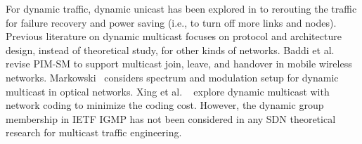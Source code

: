\documentclass[10pt, conference, letterpaper]{IEEEtran}
\theoremstyle{definition}
\begin{document}
For dynamic traffic, dynamic unicast has been explored in \cite{DynamicRouting-SDN,CompetitiveRouting,failure_recovery_rerouting,power_saving_rerouting} to rerouting the traffic for failure recovery and power saving (i.e., to turn off more links and nodes). Previous literature on dynamic multicast focuses on protocol and architecture design, instead of theoretical study, for other kinds of networks. Baddi et al.\cite{dynamic_multicast_mobile_ip} revise PIM-SM to support multicast join, leave, and handover in mobile wireless networks. Markowski~\cite{dynamic_multicast_optical_networks} considers spectrum and modulation setup for dynamic multicast in optical networks. Xing et al. ~\cite{dynamic_multicast_network_coding} explore dynamic multicast with network coding to minimize the coding cost. However, the dynamic group membership in IETF IGMP has not been considered in any SDN theoretical research for multicast traffic engineering. 
\end{document}
